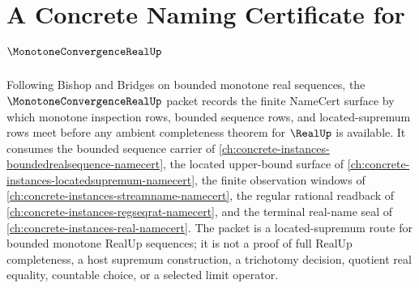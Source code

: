 \chapter{A Concrete Naming Certificate for $\MonotoneConvergenceRealUp$}
\label{ch:concrete-instances-monotone-convergence-real-namecert}

Following Bishop and Bridges on bounded monotone real sequences, the $\MonotoneConvergenceRealUp$ packet records the finite NameCert surface by which monotone inspection rows, bounded sequence rows, and located-supremum rows meet before any ambient completeness theorem for $\RealUp$ is available. It consumes the bounded sequence carrier of \autoref{ch:concrete-instances-boundedrealsequence-namecert}, the located upper-bound surface of \autoref{ch:concrete-instances-locatedsupremum-namecert}, the finite observation windows of \autoref{ch:concrete-instances-streamname-namecert}, the regular rational readback of \autoref{ch:concrete-instances-regseqrat-namecert}, and the terminal real-name seal of \autoref{ch:concrete-instances-real-namecert}. The packet is a located-supremum route for bounded monotone RealUp sequences; it is not a proof of full RealUp completeness, a host supremum construction, a trichotomy decision, quotient real equality, countable choice, or a selected limit operator.

